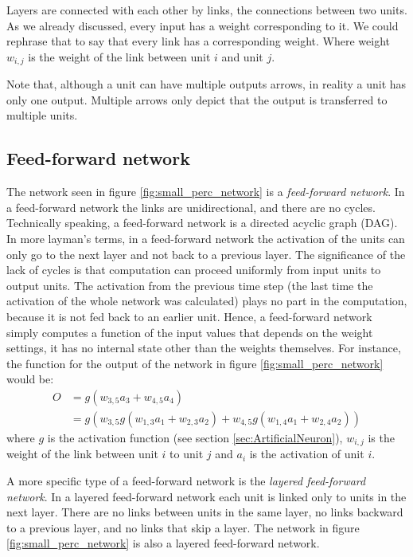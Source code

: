 Layers are connected with each other by links, the connections between two units. As we already discussed, every input has a weight corresponding to it. We could rephrase that to say that every link has a corresponding weight. Where weight $w_{i,j}$ is the weight of the link between unit $i$ and unit $j$.

Note that, although a unit can have multiple outputs arrows, in reality a unit has only one output. Multiple arrows only depict that the output is transferred to multiple units.

\subsection{Feed-forward network}
The network seen in figure \ref{fig:small_perc_network} is a \textit{feed-forward network}. In a feed-forward network the links are unidirectional, and there are no cycles. Technically speaking, a feed-forward network is a directed acyclic graph (DAG). In more layman's terms, in a feed-forward network the activation of the units can only go to the next layer and not back to a previous layer. The significance of the lack of cycles is that computation can proceed uniformly from input units to output units. The activation from the previous time step (the last time the activation of the whole network was calculated) plays no part in the computation, because it is not fed back to an earlier unit. Hence, a feed-forward network simply computes a function of the input values that depends on the weight settings, it has no internal state other than the weights themselves. For instance, the function for the output of the network in figure \ref{fig:small_perc_network} would be:
\begin{equation}
\begin{split}
O & = g(w_{3,5}a_3 + w_{4,5}a_4)\\
       & = g(w_{3,5}g(w_{1,3}a_1 + w_{2,3}a_2) + w_{4,5}g(w_{1,4}a_1 + w_{2,4}a_2))
\end{split}
\end{equation}
where $g$ is the activation function (see section \ref{sec:ArtificialNeuron}), $w_{i,j}$ is the weight of the link between unit $i$ to unit $j$ and $a_i$ is the activation of unit $i$.

A more specific type of a feed-forward network is the \textit{layered feed-forward network}. In a layered feed-forward network each unit is linked only to units in the next layer. There are no links between units in the same layer, no links backward to a previous layer, and no links that skip a layer. The network in figure \ref{fig:small_perc_network} is also a layered feed-forward network.

